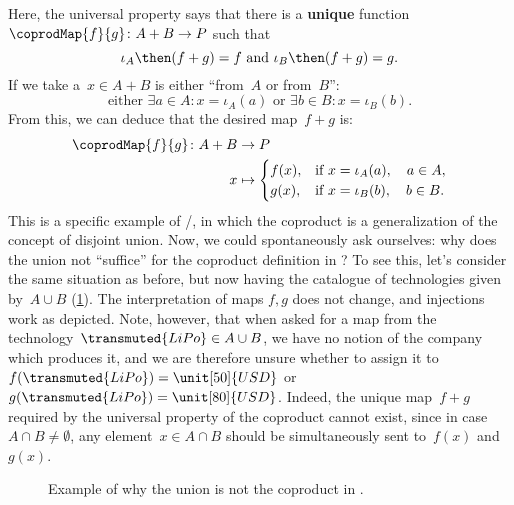 \begin{example}
    Here, the universal property says that there is a \textbf{unique} function~$\coprodMap{f}{g}\colon A+B\to P$ such that
    \begin{equation*}
        \iota_A\then (f+ g)=f \text{ and }\iota_B\then (f+ g)=g.
    \end{equation*}
    If we take a~$x\in A+B$ is either ``from~$A$ or from~$B$'':
    \begin{equation*}
        \text{either } \exists a\in A:x=\iota_A(a) \text{ or }\exists b\in B:x=\iota_B(b).
    \end{equation*}
    From this, we can deduce that the desired map~$f+g$ is:
    \begin{equation*}
        \begin{aligned}
            \coprodMap{f}{g} \colon  A + B &\to P \\
            x &   \mapsto
            \begin{cases}
                f(x),& \text{if } x=\iota_A(a),\quad a \in A, \\
                g(x),& \text{if } x=\iota_B(b),\quad b \in B.
            \end{cases}
        \end{aligned}
    \end{equation*}
    This is a specific example of \Set/\FinSet, in which the coproduct is a generalization of the concept of disjoint union. Now, we could spontaneously ask ourselves: why does the union not ``suffice'' for the coproduct definition in \Set? To see this, let's consider the same situation as before, but now having the catalogue of technologies given by~$A\cup B$ (\cref{fig:coprod_batteries_2}). The interpretation of maps $f,g$ does not change, and injections work as depicted. Note, however, that when asked for a map from the technology~$\transmuted{LiPo}\in A\cup B$, we have no notion of the company which produces it, and we are therefore unsure whether to assign it to~$f(\transmuted{LiPo})=\unit[50]{USD}$ or~$g(\transmuted{LiPo})=\unit[80]{USD}$. Indeed, the unique map~$f+g$ required by the universal property of the coproduct cannot exist, since in case~$A\cap B\neq \emptyset$, any element~$x\in A\cap B$ should be simultaneously sent to~$f(x)$ and~$g(x)$.

    \begin{figure}[h!]
        \centering
        \caption{Example of why the union is not the coproduct in \Set.}
        \label{fig:coprod_batteries_2}
    \end{figure}
\end{example}


